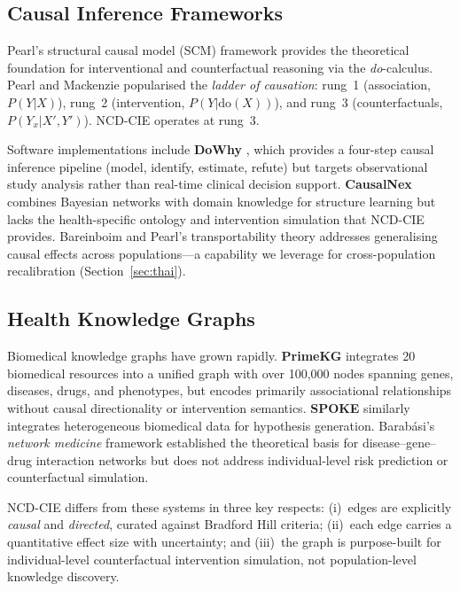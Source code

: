 \documentclass[runningheads]{llncs}
\begin{document}
\subsection{Causal Inference Frameworks}

Pearl's structural causal model (SCM) framework
\cite{pearl2009causality} provides the theoretical foundation for
interventional and counterfactual reasoning via the \emph{do}-calculus.
Pearl and Mackenzie \cite{pearl2018book} popularised the \emph{ladder
of causation}: rung~1 (association, $P(Y|X)$), rung~2 (intervention,
$P(Y|\mathrm{do}(X))$), and rung~3 (counterfactuals,
$P(Y_x|X',Y')$).  NCD-CIE operates at rung~3.

Software implementations include \textbf{DoWhy}
\cite{sharma2020dowhy}, which provides a four-step causal inference
pipeline (model, identify, estimate, refute) but targets
observational study analysis rather than real-time clinical
decision support.  \textbf{CausalNex} \cite{beaumont2021causalnex}
combines Bayesian networks with domain knowledge for structure
learning but lacks the health-specific ontology and intervention
simulation that NCD-CIE provides.  Bareinboim and Pearl's
transportability theory \cite{bareinboim2016causal} addresses
generalising causal effects across populations---a capability we
leverage for cross-population recalibration (Section~\ref{sec:thai}).

\subsection{Health Knowledge Graphs}

Biomedical knowledge graphs have grown rapidly.
\textbf{PrimeKG} \cite{chandak2023primekg} integrates 20 biomedical
resources into a unified graph with over 100{,}000 nodes spanning
genes, diseases, drugs, and phenotypes, but encodes primarily
associational relationships without causal directionality or
intervention semantics.  \textbf{SPOKE} \cite{nelson2019spoke}
similarly integrates heterogeneous biomedical data for hypothesis
generation.  Barab\'{a}si's \emph{network medicine} framework
\cite{barabasi2011network} established the theoretical basis for
disease--gene--drug interaction networks but does not address
individual-level risk prediction or counterfactual simulation.

NCD-CIE differs from these systems in three key respects: (i)~edges
are explicitly \emph{causal} and \emph{directed}, curated against
Bradford Hill criteria; (ii)~each edge carries a quantitative effect
size with uncertainty; and (iii)~the graph is purpose-built for
individual-level counterfactual intervention simulation, not
population-level knowledge discovery.
\end{document}
